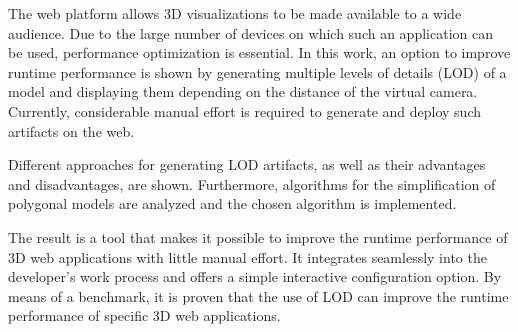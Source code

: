 The web platform allows 3D visualizations to be made available to a wide audience. Due to the large number of devices on which such an application can be used, performance optimization is essential. In this work, an option to improve runtime performance is shown by generating multiple levels of details (LOD) of a model and displaying them depending on the distance of the virtual camera. Currently, considerable manual effort is required to generate and deploy such artifacts on the web.

\bigbreak
Different approaches for generating LOD artifacts, as well as their advantages and disadvantages, are shown.
Furthermore, algorithms for the simplification of polygonal models are analyzed and the chosen algorithm is implemented.

\bigbreak
The result is a tool that makes it possible to improve the runtime performance of 3D web applications with little manual effort.
It integrates seamlessly into the developer's work process and offers a simple interactive configuration option.
By means of a benchmark, it is proven that the use of LOD can improve the runtime performance of specific 3D web applications.
